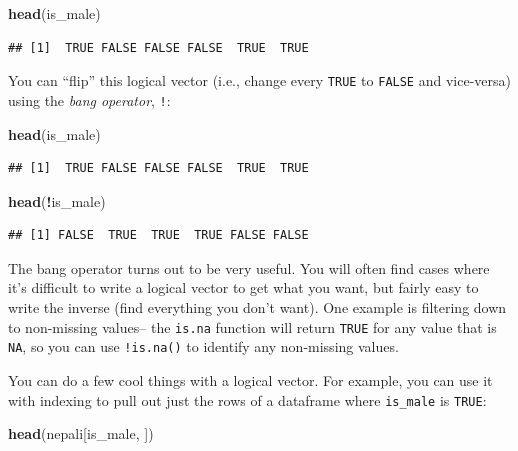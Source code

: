 \documentclass[]{book}
\makeatletter
\newenvironment{Shaded}{\begin{snugshade}}{\end{snugshade}}
\newcommand{\KeywordTok}[1]{\textcolor[rgb]{0.13,0.29,0.53}{\textbf{#1}}}
\newcommand{\OperatorTok}[1]{\textcolor[rgb]{0.81,0.36,0.00}{\textbf{#1}}}
\newcommand{\NormalTok}[1]{#1}
\newenvironment{kframe}{%
\medskip{}
\setlength{\fboxsep}{.8em}
 \def\at@end@of@kframe{}%
 \ifinner\ifhmode%
  \def\at@end@of@kframe{\end{minipage}}%
  \begin{minipage}{\columnwidth}%
 \fi\fi%
 \def\FrameCommand##1{\hskip\@totalleftmargin \hskip-\fboxsep
 \colorbox{shadecolor}{##1}\hskip-\fboxsep
     \hskip-\linewidth \hskip-\@totalleftmargin \hskip\columnwidth}%
 \MakeFramed {\advance\hsize-\width
   \@totalleftmargin\z@ \linewidth\hsize
   \@setminipage}}%
 {\par\unskip\endMakeFramed%
 \at@end@of@kframe}
\renewenvironment{Shaded}{\begin{kframe}}{\end{kframe}}
\theoremstyle{definition}
\theoremstyle{definition}
\theoremstyle{definition}
\theoremstyle{remark}
\makeatother
\begin{document}
\begin{Shaded}
\begin{Highlighting}[]
\KeywordTok{head}\NormalTok{(is_male)}
\end{Highlighting}
\end{Shaded}

\begin{verbatim}
## [1]  TRUE FALSE FALSE FALSE  TRUE  TRUE
\end{verbatim}

You can ``flip'' this logical vector (i.e., change every \texttt{TRUE}
to \texttt{FALSE} and vice-versa) using the \emph{bang operator},
\texttt{!}:

\begin{Shaded}
\begin{Highlighting}[]
\KeywordTok{head}\NormalTok{(is_male)}
\end{Highlighting}
\end{Shaded}

\begin{verbatim}
## [1]  TRUE FALSE FALSE FALSE  TRUE  TRUE
\end{verbatim}

\begin{Shaded}
\begin{Highlighting}[]
\KeywordTok{head}\NormalTok{(}\OperatorTok{!}\NormalTok{is_male)}
\end{Highlighting}
\end{Shaded}

\begin{verbatim}
## [1] FALSE  TRUE  TRUE  TRUE FALSE FALSE
\end{verbatim}

The bang operator turns out to be very useful. You will often find cases
where it's difficult to write a logical vector to get what you want, but
fairly easy to write the inverse (find everything you don't want). One
example is filtering down to non-missing values-- the \texttt{is.na}
function will return \texttt{TRUE} for any value that is \texttt{NA}, so
you can use \texttt{!is.na()} to identify any non-missing values.

You can do a few cool things with a logical vector. For example, you can
use it with indexing to pull out just the rows of a dataframe where
\texttt{is\_male} is \texttt{TRUE}:

\begin{Shaded}
\begin{Highlighting}[]
\KeywordTok{head}\NormalTok{(nepali[is_male, ])}
\end{Highlighting}
\end{Shaded}
\end{document}
